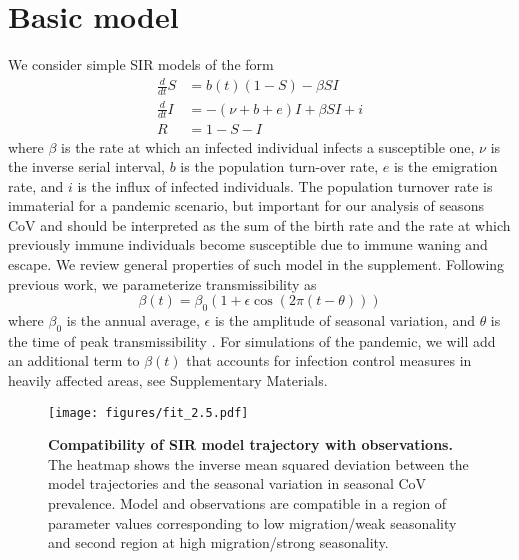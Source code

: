 \documentclass[rmp, reprint, superscriptaddress, floatfix,amsmath]{revtex4-1}
\begin{document}
\section{Basic model}
We consider simple SIR models of the form
\begin{equation}
\begin{split}
\frac{d}{dt} S & = b(t)(1-S) - \beta S I \\
\frac{d}{dt} I & = -(\nu+b+e) I + \beta S I + i\\
R & = 1-S-I
\end{split}
\label{eq:SIR}
\end{equation}
where $\beta$ is the rate at which an infected individual infects a susceptible one, $\nu$ is the inverse serial interval, $b$ is the population turn-over rate, $e$ is the emigration rate, and $i$ is the influx of infected individuals.
The population turnover rate is immaterial for a pandemic scenario, but important for our analysis of seasons CoV and should be interpreted as the sum of the birth rate and the rate at which previously immune individuals become susceptible due to immune waning and escape.
We review general properties of such model in the supplement. 
Following previous work, we parameterize transmissibility as 
\begin{equation}
\beta(t) = \beta_0\left(1+\epsilon\cos(2\pi (t-\theta))\right)
\label{eq:transmissibility}
\end{equation}
where $\beta_0$ is the annual average, $\epsilon$ is the amplitude of seasonal variation, and $\theta$ is the time of peak transmissibility \citep{dushoff_dynamical_2004,chen_regular_2017}.
For simulations of the pandemic, we will add an additional term to $\beta(t)$ that accounts for infection control measures in heavily affected areas, see Supplementary Materials.

\begin{figure}
    \centering
    \texttt{[image: figures/fit\_2.5.pdf]}
    \caption{{\bf Compatibility of SIR model trajectory with observations.} The heatmap shows the inverse mean squared deviation between the model trajectories and the seasonal variation in  seasonal CoV prevalence. Model and observations are compatible in a region of parameter values corresponding to low migration/weak seasonality and second region at high migration/strong seasonality. }
    \label{fig:parameter_seasonal}
\end{figure}
\end{document}
